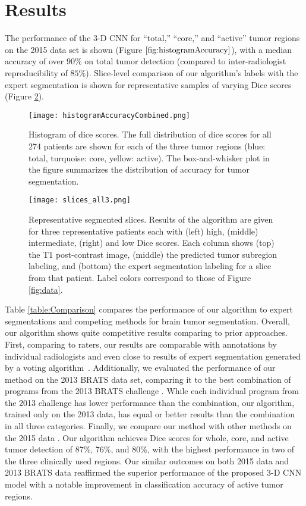 \documentclass{llncs}
\begin{document}
\section{Results}
The performance of the 3-D CNN  for ``total,'' ``core,'' and ``active'' tumor regions on the 2015 data set is shown (Figure $\ref{fig:histogramAccuracy}$), with a median accuracy of over $90\%$ on total tumor detection (compared to inter-radiologist reproducibility of $85\%$).  Slice-level comparison of our algorithm's labels with the expert segmentation is shown for representative samples of varying Dice scores (Figure \ref{fig:results}). \\
\begin{figure}[htb]
	\centering
	\texttt{[image: histogramAccuracyCombined.png]}
	\caption{{Histogram of dice scores.} \small{The full distribution of dice scores for all 274 patients are shown for each of the three tumor regions (blue: total, turquoise: core, yellow: active). The box-and-whisker plot in the figure summarizes the distribution of accuracy for tumor segmentation.}}
	\label{fig:histogramAccuracy}
\end{figure}
\begin{figure}[htb]
	\centering
	\texttt{[image: slices\_all3.png]}
	\caption{{Representative segmented slices.} \small{Results of the algorithm are given for three representative patients each with (left) high, (middle) intermediate, (right) and low Dice scores. Each column shows (top) the T1 post-contrast image, (middle) the predicted tumor subregion labeling, and (bottom) the expert segmentation labeling for a slice from that patient.  Label colors correspond to those of Figure \ref{fig:data}. \\}}
	\label{fig:results}
\end{figure}
\indent Table \ref{table:Comparison} compares the performance of our algorithm to expert segmentations and competing methods for brain tumor segmentation. Overall, our algorithm shows quite competitive results comparing to prior approaches. First, comparing to raters, our results are comparable with annotations by individual radiologists and even close to results of expert segmentation generated by a voting algorithm~\cite{brats}. Additionally, we evaluated the performance of our method on the 2013 BRATS data set, comparing it to the best combination of programs from the 2013 BRATS challenge \cite{brats}. While each individual program from the 2013 challenge has lower performance than the combination, our algorithm, trained only on the 2013 data, has equal or better results than the combination in all three categories.  Finally, we compare our method with other methods on the 2015 data \cite{brats2015}. Our algorithm achieves Dice scores for whole, core, and active tumor detection of 87\%, 76\%, and 80\%, with the highest performance in two of the three clinically used regions. Our similar outcomes on both 2015 data and 2013 BRATS data reaffirmed the superior performance of the proposed 3-D CNN model with a notable improvement in classification accuracy of active tumor regions. 
\end{document}
